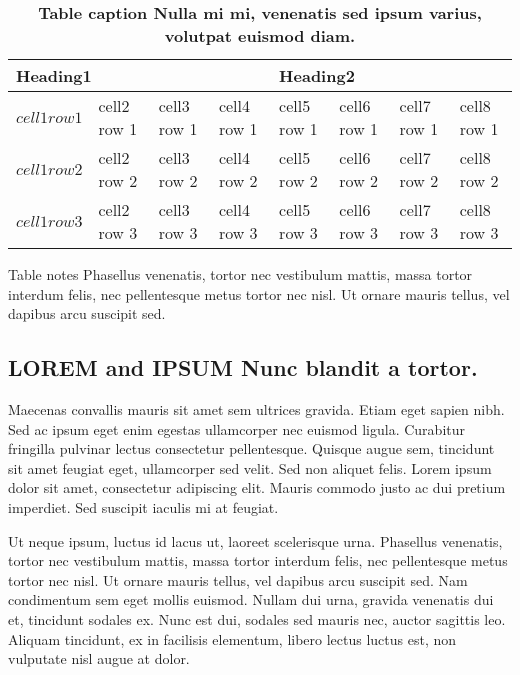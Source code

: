 \begin{table}[!ht]
\begin{adjustwidth}{-2.25in}{0in} %
\caption{
{\bf Table caption Nulla mi mi, venenatis sed ipsum varius, volutpat euismod diam.}}
\begin{tabular}{|l|l|l|l|l|l|l|l|}
\hline
\multicolumn{4}{|l|}{\bf Heading1} & \multicolumn{4}{|l|}{\bf Heading2}\\ \hline
$cell1 row1$ & cell2 row 1 & cell3 row 1 & cell4 row 1 & cell5 row 1 & cell6 row 1 & cell7 row 1 & cell8 row 1\\ \hline
$cell1 row2$ & cell2 row 2 & cell3 row 2 & cell4 row 2 & cell5 row 2 & cell6 row 2 & cell7 row 2 & cell8 row 2\\ \hline
$cell1 row3$ & cell2 row 3 & cell3 row 3 & cell4 row 3 & cell5 row 3 & cell6 row 3 & cell7 row 3 & cell8 row 3\\ \hline
\end{tabular}
\begin{flushleft} Table notes Phasellus venenatis, tortor nec vestibulum mattis, massa tortor interdum felis, nec pellentesque metus tortor nec nisl. Ut ornare mauris tellus, vel dapibus arcu suscipit sed.
\end{flushleft}
\label{table1}
\end{adjustwidth}
\end{table}



\subsection*{{\bf LOREM} and {\bf IPSUM} Nunc blandit a tortor.}

Maecenas convallis mauris sit amet sem ultrices gravida. Etiam eget sapien nibh. Sed ac ipsum eget enim egestas ullamcorper nec euismod ligula. Curabitur fringilla pulvinar lectus consectetur pellentesque. Quisque augue sem, tincidunt sit amet feugiat eget, ullamcorper sed velit. Sed non aliquet felis. Lorem ipsum dolor sit amet, consectetur adipiscing elit. Mauris commodo justo ac dui pretium imperdiet. Sed suscipit iaculis mi at feugiat. 

Ut neque ipsum, luctus id lacus ut, laoreet scelerisque urna. Phasellus venenatis, tortor nec vestibulum mattis, massa tortor interdum felis, nec pellentesque metus tortor nec nisl. Ut ornare mauris tellus, vel dapibus arcu suscipit sed. Nam condimentum sem eget mollis euismod. Nullam dui urna, gravida venenatis dui et, tincidunt sodales ex. Nunc est dui, sodales sed mauris nec, auctor sagittis leo. Aliquam tincidunt, ex in facilisis elementum, libero lectus luctus est, non vulputate nisl augue at dolor.

